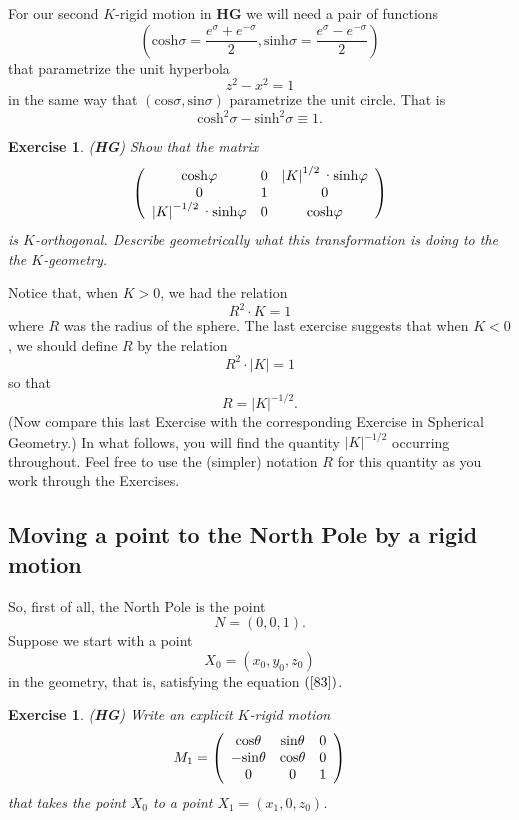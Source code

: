 \documentclass{article}%
\newtheorem{exercise}[theorem]{Exercise}
\begin{document}
For our second $K$-rigid motion in \textbf{HG} we will need a pair of
functions
\[
\left(  \mathrm{cosh}\sigma=\frac{e^{\sigma}+e^{-\sigma}}{2},\mathrm{sinh}%
\sigma=\frac{e^{\sigma}-e^{-\sigma}}{2}\right)
\]
that parametrize the unit hyperbola
\[
z^{2}-x^{2}=1
\]
in the same way that $\left(  \mathrm{cos}\sigma,\mathrm{sin}\sigma\right)  $
parametrize the unit circle. That is%
\[
\mathrm{cosh}^{2}\sigma-\mathrm{sinh}^{2}\sigma\equiv1.
\]


\begin{exercise}
(\textbf{HG}) Show that the matrix%
\[
\left(
\begin{array}
[c]{ccc}%
\mathrm{cosh}\varphi & 0 & \left\vert K\right\vert ^{1/2}%
\text{\textperiodcentered}\mathrm{sinh}\varphi\\
0 & 1 & 0\\
\left\vert K\right\vert ^{-1/2}\text{\textperiodcentered}\mathrm{sinh}\varphi
& 0 & \mathrm{cosh}\varphi
\end{array}
\right)
\]
is $K$-orthogonal. Describe geometrically what this transformation is doing to
the the $K$-geometry.
\end{exercise}

Notice that, when $K>0$, we had the relation%
\[
R^{2}\cdot K=1
\]
where $R$ was the radius of the sphere. The last exercise suggests that when
$K<0$, we should define $R$ by the relation%
\[
R^{2}\cdot\left\vert K\right\vert =1
\]
so that%
\[
R=\left\vert K\right\vert ^{-1/2}.
\]
(Now compare this last Exercise with the corresponding Exercise in Spherical
Geometry.) In what follows, you will find the quantity $\left\vert
K\right\vert ^{-1/2}$ occurring throughout. Feel free to use the (simpler)
notation $R$ for this quantity as you work through the Exercises.\pagebreak

\subsection{Moving a point to the North Pole by a rigid motion}

So, first of all, the North Pole is the point%
\[
N=\left(  0,0,1\right)  .
\]
Suppose we start with a point%
\[
X_{0}=\left(  x_{0},y_{0},z_{0}\right)
\]
in the geometry, that is, satisfying the equation $\left(  \ref{83}\right)  $.

\begin{exercise}
(\textbf{HG}) Write an explicit $K$-rigid motion%
\[
M_{1}=\left(
\begin{array}
[c]{ccc}%
\mathrm{cos}\theta & \mathrm{sin}\theta & 0\\
-\mathrm{sin}\theta & \mathrm{cos}\theta & 0\\
0 & 0 & 1
\end{array}
\right)
\]
that takes the point $X_{0}$ to a point $X_{1}=\left(  x_{1},0,z_{0}\right)  $.
\end{exercise}
\end{document}
